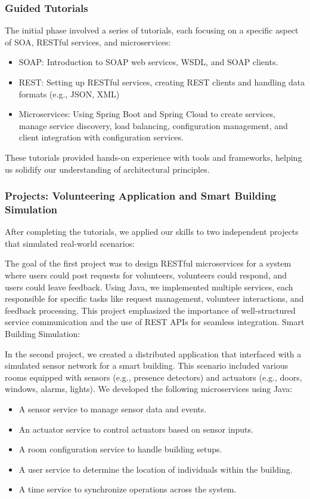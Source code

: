 \subsubsection{Guided Tutorials}
The initial phase involved a series of tutorials, each focusing on a specific aspect of SOA, RESTful services, and microservices:
\begin{itemize}
    \item SOAP: Introduction to SOAP web services, WSDL, and SOAP clients.
    \item REST: Setting up RESTful services, creating REST clients and handling data formats (e.g., JSON, XML)
    \item Microservices: Using Spring Boot and Spring Cloud to create services, manage service discovery, load balancing, configuration management, and client integration with configuration services.
\end{itemize}
These tutorials provided hands-on experience with tools and frameworks, helping us solidify our understanding of architectural principles.

\subsubsection{Projects: Volunteering Application and Smart Building Simulation}
After completing the tutorials, we applied our skills to two independent projects that simulated real-world scenarios:

\vspace{0.25cm}
The goal of the first project was to design RESTful microservices for a system where users could post requests for volunteers, volunteers could respond, and users could leave feedback.
Using Java, we implemented multiple services, each responsible for specific tasks like request management, volunteer interactions, and feedback processing. This project emphasized the importance of well-structured service communication and the use of REST APIs for seamless integration.
Smart Building Simulation:

\vspace{0.25cm}
In the second project, we created a distributed application that interfaced with a simulated sensor network for a smart building. This scenario included various rooms equipped with sensors (e.g., presence detectors) and actuators (e.g., doors, windows, alarms, lights).
We developed the following microservices using Java:
\begin{itemize}
    \item A sensor service to manage sensor data and events.
    \item An actuator service to control actuators based on sensor inputs.
    \item A room configuration service to handle building setups.
    \item A user service to determine the location of individuals within the building.
    \item A time service to synchronize operations across the system.
\end{itemize}

